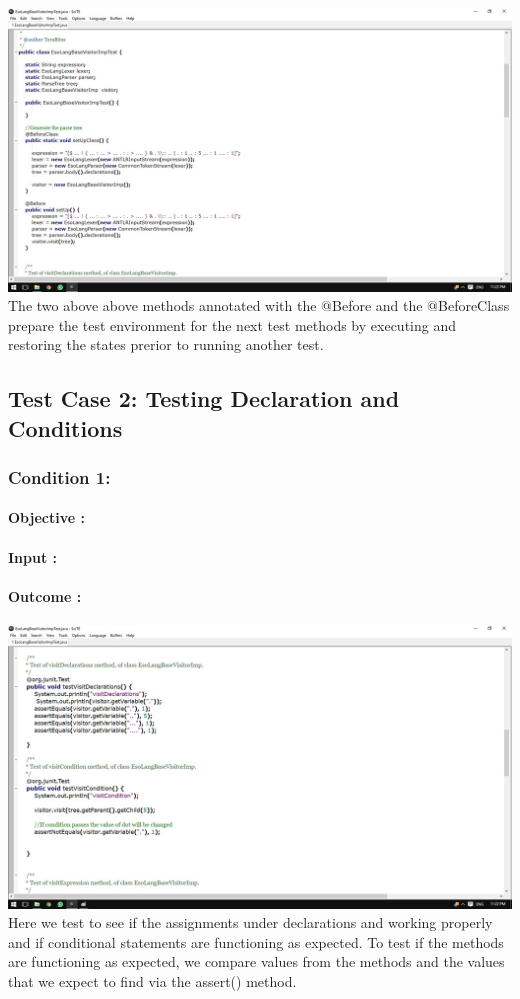\documentclass[english]{article}
\begin{document}
			\includegraphics[width=\linewidth]{test1.jpg}
			\\[12pt]
			The two above above methods annotated with the @Before and the @BeforeClass prepare the test environment for the next test methods by executing and restoring the states prerior to running another test. 
			
			\subsection{Test Case 2: Testing Declaration and Conditions}
			\subsubsection{Condition 1: }
			\paragraph{Objective :}
			\paragraph{Input :}
			\paragraph{Outcome :}
			\includegraphics[width=\linewidth]{test2.jpg}
			\\[12pt]	
			Here we test to see if the assignments under declarations and working properly and if conditional statements are functioning as expected.
			To test if the methods are functioning as expected, we compare values from the methods and the values that	we expect to find via the assert() method.	
\end{document}
